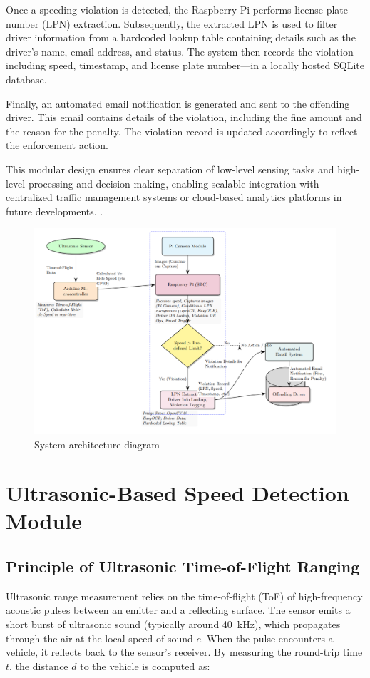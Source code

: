 Once a speeding violation is detected, the Raspberry Pi performs license plate number (LPN) extraction. Subsequently, the extracted LPN is used to filter driver information from a hardcoded lookup table containing details such as the driver’s name, email address, and status. The system then records the violation—including speed, timestamp, and license plate number—in a locally hosted SQLite database.

Finally, an automated email notification is generated and sent to the offending driver. This email contains details of the violation, including the fine amount and the reason for the penalty. The violation record is updated accordingly to reflect the enforcement action.

This modular design ensures clear separation of low-level sensing tasks and high-level processing and decision-making, enabling scalable integration with centralized traffic management systems or cloud-based analytics platforms in future developments.
.
\begin{figure}[htbp]
    \centering
    \includegraphics[width=1.0\textwidth]{figures/system_architecture_diagram.png}
    \caption{System architecture diagram}
    \label{fig:system_arch}
\end{figure}

\section{Ultrasonic-Based Speed Detection Module}
\label{sec:ultrasonic-speed-detection}

\subsection*{Principle of Ultrasonic Time-of-Flight Ranging}
Ultrasonic range measurement relies on the time-of-flight (ToF) of high-frequency acoustic pulses between an emitter and a reflecting surface. The sensor emits a short burst of ultrasonic sound (typically around 40~kHz), which propagates through the air at the local speed of sound $c$. When the pulse encounters a vehicle, it reflects back to the sensor's receiver. By measuring the round-trip time $t$, the distance $d$ to the vehicle is computed as:


